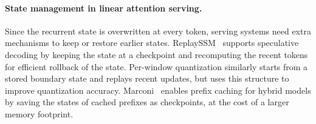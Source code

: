 \paragraph{State management in linear attention serving.}
Since the recurrent state is overwritten at every token, serving systems need extra mechanisms to keep or restore earlier states.
ReplaySSM~\citep{dao2026replayssm} supports speculative decoding by keeping the state at a checkpoint and recomputing the recent tokens for efficient rollback of the state.
Per-window quantization similarly starts from a stored boundary state and replays recent updates, but uses this structure to improve quantization accuracy.
Marconi~\citep{pan2025marconi} enables prefix caching for hybrid models by saving the states of cached prefixes as checkpoints, at the cost of a larger memory footprint.
